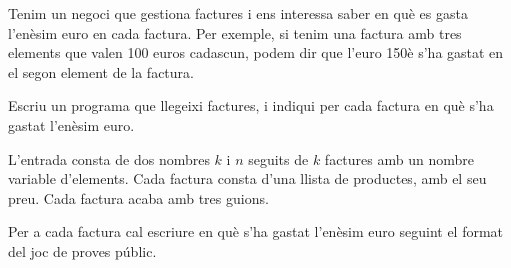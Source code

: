 

\Statement

Tenim un negoci que gestiona factures i ens interessa saber en què es gasta l'enèsim euro en cada factura. Per exemple, si tenim una factura amb tres elements que valen 100 euros cadascun, podem dir que l'euro 150è s'ha gastat en el segon element de la factura.

\medskip

Escriu un programa que llegeixi factures, i indiqui per cada factura en què s'ha gastat l'enèsim euro.

\Input

L'entrada consta de dos nombres $k$ i $n$ seguits de $k$ factures amb un nombre variable d'elements. Cada factura consta d'una llista de productes, amb el seu preu. Cada factura acaba amb tres guions.

\Output

Per a cada factura cal escriure en què s'ha gastat l'enèsim euro seguint el format del joc de proves públic.


\SampleOneCol
